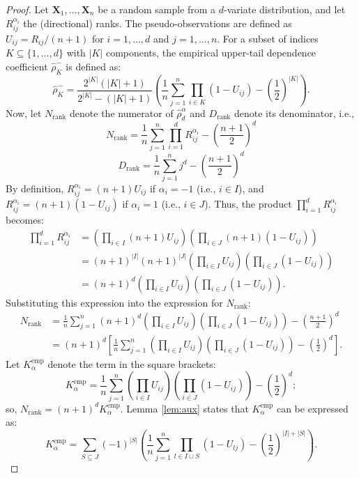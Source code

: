 \documentclass[11pt,a4paper]{article}
\begin{document}
\begin{proof}Let $\mathbf{X}_1, \ldots, \mathbf{X}_n$ be a random sample from a $d$-variate distribution, and let $R_{ij}^{\alpha_i}$ the (directional) ranks. The pseudo-observations are defined as $U_{ij} = R_{ij}/(n+1)$ for $i=1,\ldots,d$ and $j=1,\ldots,n$. For a subset of indices $K \subseteq \{1,\ldots,d\}$ with $|K|$ components, the empirical upper-tail dependence coefficient $\widehat{\rho}_K^-$ is defined as:
$$\widehat{\rho}_K^- = \frac{2^{|K|}(|K|+1)}{2^{|K|}-(|K|+1)} \left( \frac{1}{n} \sum_{j=1}^n \prod_{i \in K} (1 - U_{ij}) - \left(\frac{1}{2}\right)^{|K|} \right).$$
Now, let $N_{\text{rank}}$ denote the numerator of $\widehat{\rho}_d^{\alpha}$ and $D_{\text{rank}}$ denote its denominator, i.e.,
$$N_{\text{rank}} = \frac{1}{n}\sum_{j=1}^n\prod_{i=1}^dR_{ij}^{\alpha_i}-\left(\frac{n+1}{2}\right)^d$$
$$D_{\text{rank}} = \frac{1}{n}\sum_{j=1}^nj^d-\left(\frac{n+1}{2}\right)^d$$
By definition, $R_{ij}^{\alpha_i} = (n+1)U_{ij}$ if $\alpha_i = -1$ (i.e., $i \in I$), and $R_{ij}^{\alpha_i} = (n+1)(1-U_{ij})$ if $\alpha_i = 1$ (i.e., $i \in J$). Thus, the product $\prod_{i=1}^d R_{ij}^{\alpha_i}$ becomes:
\begin{align*} \prod_{i=1}^d R_{ij}^{\alpha_i} &= \left(\prod_{i \in I} (n+1)U_{ij}\right) \left(\prod_{i \in J} (n+1)(1-U_{ij})\right) \\ &= (n+1)^{|I|} (n+1)^{|J|} \left(\prod_{i \in I} U_{ij}\right) \left(\prod_{i \in J} (1-U_{ij})\right) \\ &= (n+1)^d \left(\prod_{i \in I} U_{ij}\right) \left(\prod_{i \in J} (1-U_{ij})\right).
\end{align*}
Substituting this expression into the expression for $N_{\text{rank}}$:
\begin{align*} N_{\text{rank}} &= \frac{1}{n}\sum_{j=1}^n (n+1)^d \left(\prod_{i \in I} U_{ij}\right) \left(\prod_{i \in J} (1-U_{ij})\right) - \left(\frac{n+1}{2}\right)^d \\ &= (n+1)^d \left[ \frac{1}{n}\sum_{j=1}^n \left(\prod_{i \in I} U_{ij}\right) \left(\prod_{i \in J} (1-U_{ij})\right) - \left(\frac{1}{2}\right)^d \right]. \end{align*}
Let $K_{\alpha}^{\text{emp}}$ denote the term in the square brackets:
$$K_{\alpha}^{\text{emp}} = \frac{1}{n}\sum_{j=1}^n \left(\prod_{i \in I} U_{ij}\right) \left(\prod_{i \in J} (1-U_{ij})\right) - \left(\frac{1}{2}\right)^d;$$
so, $N_{\text{rank}} = (n+1)^d K_{\alpha}^{\text{emp}}$. Lemma \ref{lem:aux} states that $K_{\alpha}^{\text{emp}}$ can be expressed as:
$$K_{\alpha}^{\text{emp}} = \sum_{S \subseteq J} (-1)^{|S|} \left( \frac{1}{n} \sum_{j=1}^n \prod_{l \in I \cup S} (1 - U_{lj}) - \left(\frac{1}{2}\right)^{|I|+|S|} \right).$$

\end{proof}
\end{document}

